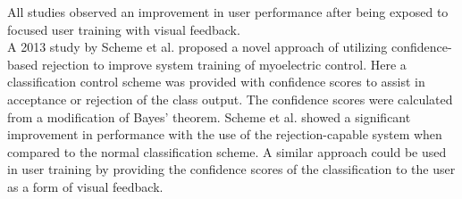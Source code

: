 All studies observed an improvement in user performance after being exposed to focused user training with visual feedback. \\
A 2013 study by Scheme et al. \cite{Scheme2013} proposed a novel approach of utilizing confidence-based rejection to improve system training of myoelectric control. Here a classification control scheme was provided with confidence scores to assist in acceptance or rejection of the class output. The confidence scores were calculated from a modification of Bayes' theorem. Scheme et al. \cite{Scheme2013} showed a significant improvement in performance with the use of the rejection-capable system when compared to the normal classification scheme. A similar approach could be used in user training by providing the confidence scores of the classification to the user as a form of visual feedback. 
